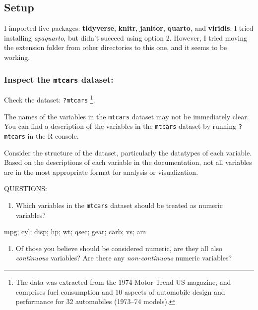 \documentclass[
  man,
  floatsintext,
  longtable,
  nolmodern,
  notxfonts,
  notimes,
  colorlinks=true,linkcolor=blue,citecolor=blue,urlcolor=blue]{apa7}
\providecommand{\tightlist}{%
  \setlength{\itemsep}{0pt}\setlength{\parskip}{0pt}}
\begin{document}
\subsection{Setup}\label{setup}

I imported five packages: \textbf{tidyverse}, \textbf{knitr},
\textbf{janitor}, \textbf{quarto}, and \textbf{viridis}. I tried
installing \emph{apaquarto}, but didn't succeed using option 2. However,
I tried moving the extension folder from other directories to this one,
and it seems to be working.

\subsubsection{\texorpdfstring{Inspect the \texttt{mtcars}
dataset:}{Inspect the mtcars dataset:}}\label{inspect-the-mtcars-dataset}

Check the dataset: \texttt{?mtcars} \footnote{The data was extracted
  from the 1974 Motor Trend US magazine, and comprises fuel consumption
  and 10 aspects of automobile design and performance for 32 automobiles
  (1973--74 models).}.

The names of the variables in the \texttt{mtcars} dataset may not be
immediately clear. You can find a description of the variables in the
\texttt{mtcars} dataset by running \texttt{?mtcars} in the R console.

Consider the structure of the dataset, particularly the datatypes of
each variable. Based on the descriptions of each variable in the
documentation, not all variables are in the most appropriate format for
analysis or visualization.

QUESTIONS:

\begin{enumerate}
\def\labelenumi{\arabic{enumi}.}
\tightlist
\item
  Which variables in the \texttt{mtcars} dataset should be treated as
  numeric variables?
\end{enumerate}

mpg; cyl; disp; hp; wt; qsec; gear; carb; vs; am

\begin{enumerate}
\def\labelenumi{\arabic{enumi}.}
\setcounter{enumi}{1}
\tightlist
\item
  Of those you believe should be considered numeric, are they all also
  \emph{continuous} variables? Are there any \emph{non-continuous}
  numeric variables?
\end{enumerate}
\end{document}
